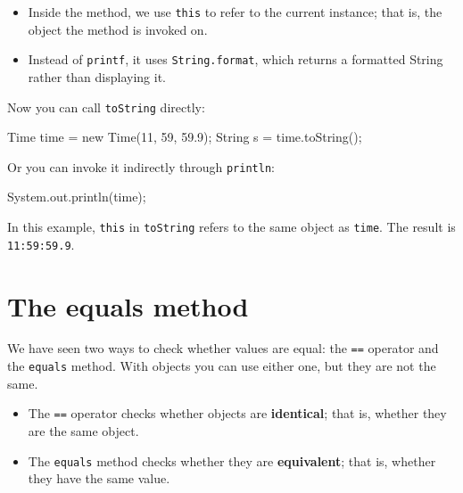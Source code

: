 \documentclass[12pt]{book}
\theoremstyle{exercise}
\newcommand{\java}[1]{\verb"#1"}
\begin{document}
\begin{itemize}

\item Inside the method, we use \java{this} to refer to the current instance; that is, the object the method is invoked on.

\item Instead of \java{printf}, it uses \java{String.format}, which returns a formatted String rather than displaying it.

\end{itemize}


Now you can call \java{toString} directly:

\begin{code}
    Time time = new Time(11, 59, 59.9);
    String s = time.toString();
\end{code}

Or you can invoke it indirectly through \java{println}:

\begin{code}
    System.out.println(time);
\end{code}

In this example, \java{this} in \java{toString} refers to the same object as \java{time}.
The result is \java{11:59:59.9}.


\section{The equals method}
\label{equals}


We have seen two ways to check whether values are equal: the \java{==} operator and the \java{equals} method.
With objects you can use either one, but they are not the same.



\begin{itemize}

\item The \java{==} operator checks whether objects are {\bf identical}; that is, whether they are the same object.


\item The \java{equals} method checks whether they are {\bf equivalent}; that is, whether they have the same value.

\end{itemize}
\end{document}
